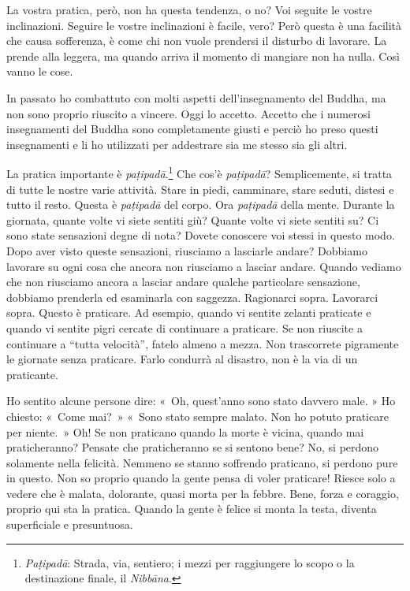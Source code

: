 La vostra pratica, però, non ha questa tendenza, o no? Voi seguite le
vostre inclinazioni. Seguire le vostre inclinazioni è facile, vero? Però
questa è una facilità che causa sofferenza, è come chi non vuole
prendersi il disturbo di lavorare. La prende alla leggera, ma quando
arriva il momento di mangiare non ha nulla. Così vanno le cose.

In passato ho combattuto con molti aspetti dell'insegnamento del Buddha,
ma non sono proprio riuscito a vincere. Oggi lo accetto. Accetto che i
numerosi insegnamenti del Buddha sono completamente giusti e perciò ho
preso questi insegnamenti e li ho utilizzati per addestrare sia me
stesso sia gli altri.

La pratica importante è \emph{paṭipadā}.\footnote{\emph{Paṭipadā}:
  Strada, via, sentiero; i mezzi per raggiungere lo scopo o la
  destinazione finale, il \emph{Nibbāna}.} Che cos'è \emph{paṭipadā}?
Semplicemente, si tratta di tutte le nostre varie attività. Stare in
piedi, camminare, stare seduti, distesi e tutto il resto. Questa è
\emph{paṭipadā} del corpo. Ora \emph{paṭipadā} della mente. Durante la
giornata, quante volte vi siete sentiti giù? Quante volte vi siete
sentiti su? Ci sono state sensazioni degne di nota? Dovete conoscere voi
stessi in questo modo. Dopo aver visto queste sensazioni, riusciamo a
lasciarle andare? Dobbiamo lavorare su ogni cosa che ancora non
riusciamo a lasciar andare. Quando vediamo che non riusciamo ancora a
lasciar andare qualche particolare sensazione, dobbiamo prenderla ed
esaminarla con saggezza. Ragionarci sopra. Lavorarci sopra. Questo è
praticare. Ad esempio, quando vi sentite zelanti praticate e quando vi
sentite pigri cercate di continuare a praticare. Se non riuscite a
continuare a ``tutta velocità'', fatelo almeno a mezza. Non trascorrete
pigramente le giornate senza praticare. Farlo condurrà al disastro, non
è la via di un praticante.

Ho sentito alcune persone dire: «~Oh, quest'anno sono stato davvero
male. » Ho chiesto: «~Come mai?~» «~Sono stato sempre malato. Non ho
potuto praticare per niente.~» Oh! Se non praticano quando la morte è
vicina, quando mai praticheranno? Pensate che praticheranno se si
sentono bene? No, si perdono solamente nella felicità. Nemmeno se stanno
soffrendo praticano, si perdono pure in questo. Non so proprio quando la
gente pensa di voler praticare! Riesce solo a vedere che è malata,
dolorante, quasi morta per la febbre. Bene, forza e coraggio, proprio
qui sta la pratica. Quando la gente è felice si monta la testa, diventa
superficiale e presuntuosa.

